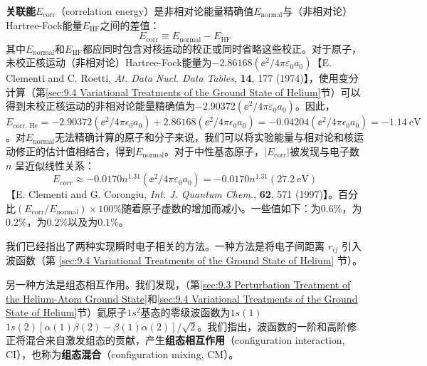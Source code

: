     \textbf{关联能}$E_{\text{corr}}$（correlation energy）是非相对论能量精确值$E_{\text{normal}}$与（非相对论）Hartree-Fock能量$E_{\text{HF}}$之间的差值：
    \begin{equation}
        E_{\text{corr}} \equiv E_{\text{normal}} - E_{\text{HF}}
        \label{eq:11.16}
    \end{equation}
    其中$E_{\text{normal}}$和$E_{\text{HF}}$都应同时包含对核运动的校正或同时省略这些校正。对于原子，未校正核运动（非相对论）Hartree-Fock能量为$-2.86168 \left(\ee ^2 / 4\pi\varepsilon_0a_0\right)$【E. Clementi and C. Roetti, \textit{At. Data Nucl. Data Tables}, \textbf{14}, 177 (1974)】，使用变分计算（第\ref{sec:9.4 Variational Treatments of the Ground State of Helium}节）可以得到未校正核运动的非相对论能量精确值为$-2.90372 \left(\ee ^2 / 4\pi\varepsilon_0a_0\right)$。因此，$E_{\text{corr, He}} = -2.90372 \left(\ee ^2/4\pi\epsilon_0 a_0\right) + 2.86168 \left(\ee ^2/4\pi\epsilon_0 a_0\right) = -0.04204 \left(\ee ^2/4\pi\epsilon_0 a_0\right) = -1.14 \:\mathrm{eV}$。对$E_{\text{normal}}$无法精确计算的原子和分子来说，我们可以将实验能量与相对论和核运动修正的估计值相结合，得到$E_{\text{normal}}$。对于中性基态原子，$\left|E_{\text{corr}}\right|$被发现与电子数 $n$ 呈近似线性关系：
    \begin{equation*}
        E_{corr} \approx -0.0170 n^{1.31} \left(\ee ^{2} / 4 \pi \varepsilon_{0} a_{0}\right)=-0.0170 n^{1.31}(27.2 \: \mathrm{eV})
    \end{equation*}
    【E. Clementi and G. Corongiu, \textit{Int. J. Quantum Chem.}, \textbf{62}, 571 (1997)】。百分比$\left(E_{\text{corr}} / E_{\text{normal}}\right) \times 100 \%$随着原子虚数的增加而减小。一些值如下：为$0.6\%$，为$0.2\%$，为$0.2\%$以及为$0.1\%$。

    我们已经指出了两种实现瞬时电子相关的方法。一种方法是将电子间距离 $r_{ij}$ 引入波函数（第 \ref{sec:9.4 Variational Treatments of the Ground State of Helium} 节）。

    另一种方法是组态相互作用。我们发现，（第\ref{sec:9.3 Perturbation Treatment of the Helium-Atom Ground State}和\ref{sec:9.4 Variational Treatments of the Ground State of Helium}节）氦原子$1s^2$基态的零级波函数为$1s\left(1\right)$\\$1s\left(2\right)\left[\alpha\left(1\right)\beta\left(2\right) - \beta\left(1\right)\alpha\left(2\right)\right]/\sqrt{2}$。我们指出，波函数的一阶和高阶修正将混合来自激发组态的贡献，产生\textbf{组态相互作用}（configuration interaction, CI），也称为\textbf{组态混合}（configuration mixing, CM）。

